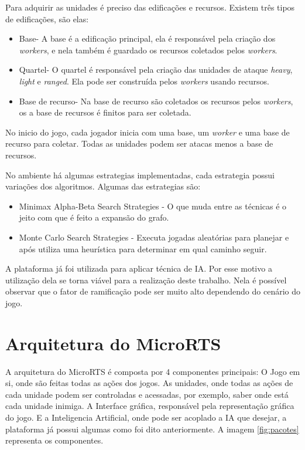 Para adquirir as unidades é preciso das edificações e recursos. Existem três tipos de edificações, são elas:

\begin{itemize}
	\item Base- A base é a edificação principal, ela é responsável pela criação dos \textit{workers}, e nela também é guardado os recursos coletados pelos \textit{workers}. 
	\item Quartel- O quartel é responsável pela criação das unidades de ataque \textit{heavy}, \textit{light} e \textit{ranged}. Ela pode ser construída pelos \textit{workers} usando recursos.
	\item Base de recurso- Na base de recurso são coletados os recursos pelos \textit{workers}, os a base de recursos é finitos para ser coletada.
\end{itemize}  

No inicio do jogo, cada jogador inicia com uma base, um \textit{worker} e uma base de recurso para coletar. Todas as unidades podem ser atacas menos a base de recursos. 
 
No ambiente há algumas estrategias implementadas, cada estrategia possui variações dos algoritmos. Algumas das estrategias são:
 \begin{itemize}
 	\item Minimax Alpha-Beta Search Strategies - O que muda entre as técnicas é o jeito com que é feito a expansão do grafo.
 	\item Monte Carlo Search Strategies - Executa jogadas aleatórias para planejar e após utiliza uma heurística para determinar em qual caminho seguir.
 \end{itemize}
 
 A plataforma já foi utilizada para aplicar técnica de IA. Por esse motivo a utilização dela se torna viável para a realização deste trabalho. 
Nela é possível observar que o fator de ramificação pode ser muito alto dependendo do cenário do jogo.

\section{Arquitetura do MicroRTS}

A arquitetura do MicroRTS é composta por 4 componentes principais: O Jogo em si, onde são feitas todas as ações dos jogos. As unidades, onde todas as ações de cada unidade podem ser controladas e acessadas, por exemplo, saber onde está cada unidade inimiga. A Interface gráfica, responsável pela representação gráfica do jogo. E a Inteligencia Artificial, onde pode ser acoplado a IA que desejar, a plataforma já possui algumas como foi dito anteriormente. A imagem \ref{fig:pacotes} representa os componentes.

